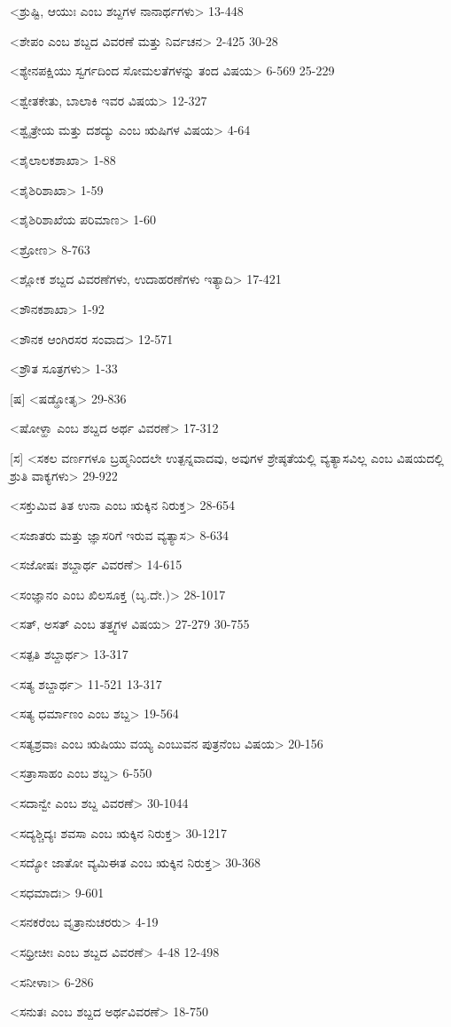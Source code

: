 <ಶ್ರುಷ್ಟಿ, ಆಯುಃ ಎಂಬ ಶಬ್ದಗಳ ನಾನಾರ್ಥಗಳು>
13-448

<ಶೇಪಂ ಎಂಬ ಶಬ್ದದ ವಿವರಣೆ ಮತ್ತು ನಿರ್ವಚನ>
2-425
30-28

<ಶ್ಯೇನಪಕ್ಷಿಯು ಸ್ವರ್ಗದಿಂದ ಸೋಮಲತೆಗಳನ್ನು ತಂದ ವಿಷಯ>
6-569
25-229

<ಶ್ವೇತಕೇತು, ಬಾಲಾಕಿ ಇವರ ವಿಷಯ>
12-327

<ಶ್ವೈತ್ರೇಯ ಮತ್ತು ದಶದ್ಯು ಎಂಬ ಋಷಿಗಳ ವಿಷಯ>
4-64

<ಶೈಲಾಲಕಶಾಖಾ>
1-88

<ಶೈಶಿರಿಶಾಖಾ>
1-59

<ಶೈಶಿರಿಶಾಖೆಯ ಪರಿಮಾಣ>
1-60

<ಶ್ರೋಣ>
8-763

<ಶ್ಲೋಕ ಶಬ್ದದ ವಿವರಣೆಗಳು, ಉದಾಹರಣೆಗಳು ಇತ್ಯಾದಿ>
17-421

<ಶೌನಕಶಾಖಾ>
1-92

<ಶೌನಕ ಆಂಗಿರಸರ ಸಂವಾದ>
12-571

<ಶ್ರೌತ ಸೂತ್ರಗಳು>
1-33

[ಷ]
<ಷಡ್ಢೋತೃ>
29-836

<ಷೋಳ್ಹಾ ಎಂಬ ಶಬ್ದದ ಅರ್ಥ ವಿವರಣೆ>
17-312

[ಸ]
<ಸಕಲ ವರ್ಣಗಳೂ ಬ್ರಹ್ಮನಿಂದಲೇ ಉತ್ಪನ್ನವಾದವು, ಅವುಗಳ ಶ್ರೇಷ್ಠತೆಯಲ್ಲಿ ವ್ಯತ್ಯಾಸವಿಲ್ಲ ಎಂಬ ವಿಷಯದಲ್ಲಿ ಶ್ರುತಿ ವಾಕ್ಯಗಳು>
29-922

<ಸಕ್ತುಮಿವ ತಿತ ಉನಾ ಎಂಬ ಋಕ್ಕಿನ ನಿರುಕ್ತ>
28-654

<ಸಜಾತರು ಮತ್ತು ಜ್ಞಾಸರಿಗೆ ಇರುವ ವ್ಯತ್ಯಾಸ>
8-634

<ಸಜೋಷಃ ಶಬ್ದಾರ್ಥ ವಿವರಣೆ>
14-615

<ಸಂಜ್ಞಾನಂ ಎಂಬ ಖಿಲಸೂಕ್ತ (ಬೃ.ದೇ.)>
28-1017

<ಸತ್‍, ಅಸತ್‍ ಎಂಬ ತತ್ತ್ವಗಳ ವಿಷಯ>
27-279
30-755

<ಸತ್ಪತಿ ಶಬ್ದಾರ್ಥ>
13-317

<ಸತ್ಯ ಶಬ್ದಾರ್ಥ>
11-521
13-317

<ಸತ್ಯ ಧರ್ಮಾಣಂ ಎಂಬ ಶಬ್ದ>
19-564

<ಸತ್ಯಶ್ರವಾಃ ಎಂಬ ಋಷಿಯು ವಯ್ಯ ಎಂಬುವನ ಪುತ್ರನೆಂಬ ವಿಷಯ>
20-156

<ಸತ್ರಾಸಾಹಂ ಎಂಬ ಶಬ್ದ>
6-550

<ಸದಾನ್ವೇ ಎಂಬ ಶಬ್ದ ವಿವರಣೆ>
30-1044

<ಸದ್ಯಶ್ಚಿದ್ಯಃ ಶವಸಾ ಎಂಬ ಋಕ್ಕಿನ ನಿರುಕ್ತ>
30-1217

<ಸದ್ಯೋ ಜಾತೋ ವ್ಯಮಿಈತ ಎಂಬ ಋಕ್ಕಿನ ನಿರುಕ್ತ>
30-368

<ಸಧಮಾದಃ>
9-601

<ಸನಕರೆಂಬ ವೃತ್ರಾನುಚರರು>
4-19

<ಸಧ್ರೀಚೀಃ ಎಂಬ ಶಬ್ದದ ವಿವರಣೆ>
4-48 
12-498

<ಸನೀಳಾಃ>
6-286

<ಸನುತಃ ಎಂಬ ಶಬ್ದದ ಅರ್ಥವಿವರಣೆ>
18-750

